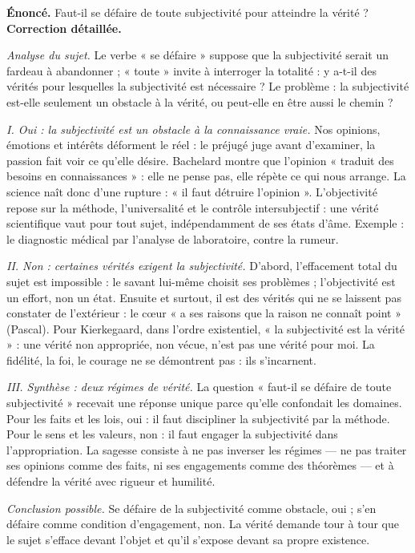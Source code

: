 \documentclass[11pt]{article}
\begin{document}
\begin{exoresolu}
\textbf{Énoncé.} Faut-il se défaire de toute subjectivité pour atteindre la vérité ?
\tcblower
\textbf{Correction détaillée.}

\emph{Analyse du sujet.} Le verbe « se défaire » suppose que la subjectivité serait un fardeau à abandonner ; « toute » invite à interroger la totalité : y a-t-il des vérités pour lesquelles la subjectivité est nécessaire ? Le problème : la subjectivité est-elle seulement un obstacle à la vérité, ou peut-elle en être aussi le chemin ?

\emph{I. Oui : la subjectivité est un obstacle à la connaissance vraie.}
Nos opinions, émotions et intérêts déforment le réel : le préjugé juge avant d'examiner, la passion fait voir ce qu'elle désire. Bachelard montre que l'opinion « traduit des besoins en connaissances » : elle ne pense pas, elle répète ce qui nous arrange. La science naît donc d'une rupture : « il faut détruire l'opinion ». L'objectivité repose sur la méthode, l'universalité et le contrôle intersubjectif : une vérité scientifique vaut pour tout sujet, indépendamment de ses états d'âme. Exemple : le diagnostic médical par l'analyse de laboratoire, contre la rumeur.

\emph{II. Non : certaines vérités exigent la subjectivité.}
D'abord, l'effacement total du sujet est impossible : le savant lui-même choisit ses problèmes ; l'objectivité est un effort, non un état. Ensuite et surtout, il est des vérités qui ne se laissent pas constater de l'extérieur : le cœur « a ses raisons que la raison ne connaît point » (Pascal). Pour Kierkegaard, dans l'ordre existentiel, « la subjectivité est la vérité » : une vérité non appropriée, non vécue, n'est pas une vérité pour moi. La fidélité, la foi, le courage ne se démontrent pas : ils s'incarnent.

\emph{III. Synthèse : deux régimes de vérité.}
La question « faut-il se défaire de toute subjectivité » recevait une réponse unique parce qu'elle confondait les domaines. Pour les faits et les lois, oui : il faut discipliner la subjectivité par la méthode. Pour le sens et les valeurs, non : il faut engager la subjectivité dans l'appropriation. La sagesse consiste à ne pas inverser les régimes — ne pas traiter ses opinions comme des faits, ni ses engagements comme des théorèmes — et à défendre la vérité avec rigueur et humilité.

\emph{Conclusion possible.} Se défaire de la subjectivité comme obstacle, oui ; s'en défaire comme condition d'engagement, non. La vérité demande tour à tour que le sujet s'efface devant l'objet et qu'il s'expose devant sa propre existence.
\end{exoresolu}
\end{document}
